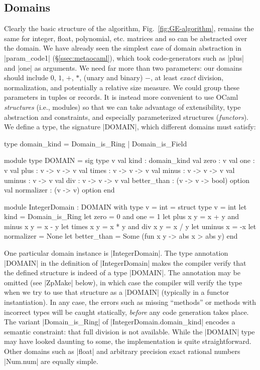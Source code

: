 \documentclass{elsart}
\begin{document}
\subsection{Domains}\label{sec:domains}

Clearly the basic structure of the algorithm,
Fig.~\ref{fig:GE-algorithm}, remains the same for integer, float,
polynomial, 
etc. matrices and so can be abstracted over the domain.  We
have already seen the simplest case of domain abstraction in
|param_code1| (\S\ref{ssec:metaocaml}), which took code-generators such as
|plus| and |one| as arguments.  We need far more than two parameters: our
domains should include $0$, $1$, $+$, $*$, (unary and binary) $-$, at least
\emph{exact} division, normalization, and potentially a relative size
measure. We could group these parameters in tuples or records.
It is instead more convenient to use OCaml \emph{structures} (i.e., modules) so
that we can take
advantage of extensibility, type abstraction and constraints, and
especially parameterized structures (\emph{functors}).  We define a
type, the signature |DOMAIN|, which different domains must satisfy:

\begin{code}
type domain_kind = Domain_is_Ring | Domain_is_Field

module type DOMAIN = sig
  type v
  val kind   : domain_kind
  val zero   : v
  val one    : v
  val plus   : v -> v -> v
  val times  : v -> v -> v
  val minus  : v -> v -> v
  val uminus : v -> v
  val div    : v -> v -> v
  val better_than : (v -> v -> bool) option
  val normalizer  : (v -> v) option
end 

module IntegerDomain : DOMAIN with type v = int  = struct
  type v = int
  let kind      = Domain_is_Ring
  let zero      = 0     and one       = 1
  let plus x y  = x + y and minus x y = x - y
  let times x y = x * y and div x y   = x / y
  let uminus x  = -x
  let normalizer = None
  let better_than = Some (fun x y -> abs x > abs y)
end
\end{code}

One particular domain instance is |IntegerDomain|. The type annotation
|DOMAIN| in the definition of |IntegerDomain| makes the 
compiler verify that the defined structure is indeed of a type |DOMAIN|. 
The annotation may be omitted (see |ZpMake| below), in which
case the compiler will verify the type when we try to use that structure as a
|DOMAIN| (typically in a functor instantiation). In any case, the errors such
as missing ``methods'' or methods with incorrect types will be caught
statically, \emph{before} any code generation takes place. The variant
|Domain_is_Ring| of |IntegerDomain.domain_kind| encodes a semantic constraint:
that full division
is not available. While the |DOMAIN| type may have looked daunting to
some, the implementation is quite straightforward.  Other domains such
as |float| and arbitrary precision exact rational numbers |Num.num|
are equally simple.
\end{document}
